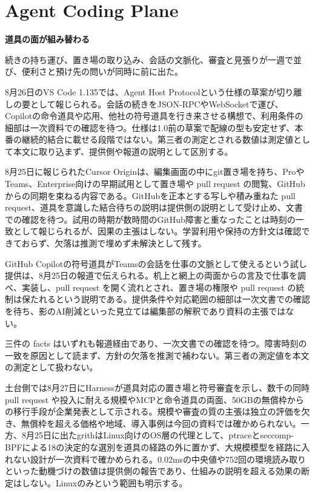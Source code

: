 \section{Agent Coding Plane}
\begin{wideflow}
{\Large\bfseries 道具の面が組み替わる}\par
\smallskip
{\color{SurveyMuted}続きの持ち運び、置き場の取り込み、会話の文脈化、審査と見張りが一週で並び、便利さと預け先の問いが同時に前に出た。}\par
\end{wideflow}

8月26日のVS Code 1.135では、Agent Host Protocolという仕様の草案が切り離しの要として報じられる\cite{vscodeahp}。会話の続きをJSON-RPCやWebSocketで運び、Copilotの命令道具や応用、他社の符号道具を行き来させる構想で、利用条件の細部は一次資料での確認を待つ。仕様は1.0前の草案で配線の型も安定せず、本番の継続的結合に載せる段階ではない。第三者の測定とされる数値は測定値として本文に取り込まず、提供側や報道の説明として区別する。

8月25日に報じられたCursor Originは、編集画面の中にgit置き場を持ち、ProやTeams、Enterprise向けの早期試用として置き場や pull request の閲覧、GitHubからの同期を束ねる内容である\cite{cursororigin}。GitHubを正本とする写しや積み重ねた pull request、道具を意識した結合待ちの説明は提供側の説明として受け止め、文書での確認を待つ。試用の時期が数時間のGitHub障害と重なったことは時刻の一致として報じられるが、因果の主張はしない。学習利用や保持の方針文は確認できておらず、欠落は推測で埋めず未解決として残す。

GitHub Copilotの符号道具がTeamsの会話を仕事の文脈として使えるという試し提供は、8月25日の報道で伝えられる\cite{copilotteams}。机上と網上の両面からの言及で仕事を調べ、実装し、pull request を開く流れとされ、置き場の権限や pull request の統制は保たれるという説明である。提供条件や対応範囲の細部は一次文書での確認を待ち、影のAI削減といった見立ては編集部の解釈であり資料の主張ではない。

\begin{claimboundary}[未解決の境界]
三件の facts はいずれも報道経由であり、一次文書での確認を待つ。障害時刻の一致を原因として読まず、方針の欠落を推測で補わない。第三者の測定値を本文の測定として扱わない。
\end{claimboundary}

土台側では8月27日にHarnessが道具対応の置き場と符号審査を示し、数千の同時 pull request や投入に耐える規模やMCPと命令道具の両面、50GBの無償枠からの移行手段が企業発表として示される\cite{harness}。規模や審査の質の主張は独立の評価を欠き、無償枠を超える価格や地域、導入事例は今回の資料では確かめられない。一方、8月25日に出たgrithはLinux向けのOS層の代理として、ptraceとseccomp-BPFによる18の決定的な選別を道具の経路の外に置かず、大規模模型を経路に入れない設計が一次資料で確かめられる\cite{grith}。0.02msの中央値や752回の環境読み取りといった動機づけの数値は提供側の報告であり、仕組みの説明を超える効果の断定はしない。Linuxのみという範囲も明示する。
